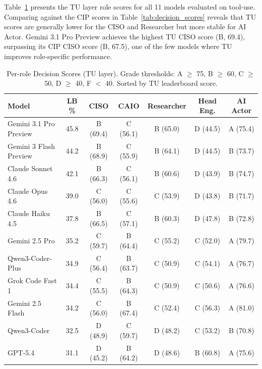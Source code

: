 \documentclass[10pt,twocolumn]{article}
\begin{document}
Table~\ref{tab:tu_scores} presents the TU layer role scores for all 11 models evaluated on tool-use. Comparing against the CIP scores in Table~\ref{tab:decision_scores} reveals that TU scores are generally lower for the CISO and Researcher but more stable for AI Actor. Gemini 3.1 Pro Preview achieves the highest TU CISO score (B, 69.4), surpassing its CIP CISO score (B, 67.5), one of the few models where TU improves role-specific performance.

\begin{table}[t]
\centering
\caption{Per-role Decision Scores (TU layer). Grade thresholds: A $\geq$ 75, B $\geq$ 60, C $\geq$ 50, D $\geq$ 40, F $<$ 40. Sorted by TU leaderboard score.}
\label{tab:tu_scores}
\small
\begin{tabular}{@{}l c c c c c c@{}}
\toprule
\textbf{Model} & \textbf{LB \%} & \textbf{CISO} & \textbf{CAIO} & \textbf{Researcher} & \textbf{Head Eng.} & \textbf{AI Actor} \\
\midrule
Gemini 3.1 Pro Preview   & 45.8 & B (69.4) & C (56.1) & B (65.0) & D (44.5) & A (75.4) \\
Gemini 3 Flash Preview   & 44.2 & B (68.9) & C (55.9) & B (64.1) & D (44.5) & B (73.7) \\
Claude Sonnet 4.6        & 42.1 & B (66.3) & C (56.1) & B (60.6) & D (43.9) & B (74.7) \\
Claude Opus 4.6          & 39.0 & C (56.0) & C (55.6) & C (53.9) & D (43.8) & B (71.7) \\
Claude Haiku 4.5         & 37.8 & B (66.5) & C (57.1) & B (60.3) & D (47.8) & B (72.8) \\
Gemini 2.5 Pro           & 35.2 & C (59.7) & B (64.4) & C (55.2) & C (52.0) & A (79.7) \\
Qwen3-Coder-Plus         & 34.9 & C (56.4) & B (63.7) & C (50.9) & C (54.1) & A (76.7) \\
Grok Code Fast 1         & 34.4 & C (55.5) & B (64.3) & C (50.9) & C (50.6) & A (76.6) \\
Gemini 2.5 Flash         & 34.2 & C (56.0) & B (67.4) & C (52.4) & C (56.3) & A (81.0) \\
Qwen3-Coder              & 32.5 & D (48.9) & C (59.7) & D (48.2) & C (53.2) & B (70.8) \\
GPT-5.4                  & 31.1 & D (45.2) & B (64.2) & D (48.6) & B (60.8) & A (75.6) \\
\bottomrule
\end{tabular}
\end{table}
\end{document}
